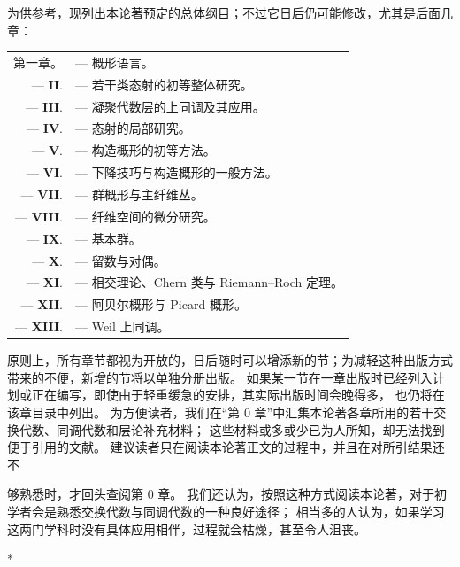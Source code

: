\documentclass[UTF8,fontset=none,11pt,oneside,openany]{ctexbook}
\newcommand{\oldpage}[2][]{%
  \hypertarget{ega-source-page-#1-#2}{}%
  \marginnote{\scriptsize\textbf{#1}~|~#2}\ignorespaces}
\begin{document}
为供参考，现列出本论著预定的总体纲目；不过它日后仍可能修改，尤其是后面几章：

\medskip
\begin{tabular}{rl}
  第一章。 & --- 概形语言。\\
  --- \textbf{II}. & --- 若干类态射的初等整体研究。\\
  --- \textbf{III}. & --- 凝聚代数层的上同调及其应用。\\
  --- \textbf{IV}. & --- 态射的局部研究。\\
  --- \textbf{V}. & --- 构造概形的初等方法。\\
  --- \textbf{VI}. & --- 下降技巧与构造概形的一般方法。\\
  --- \textbf{VII}. & --- 群概形与主纤维丛。\\
  --- \textbf{VIII}. & --- 纤维空间的微分研究。\\
  --- \textbf{IX}. & --- 基本群。\\
  --- \textbf{X}. & --- 留数与对偶。\\
  --- \textbf{XI}. & --- 相交理论、Chern 类与 Riemann--Roch 定理。\\
  --- \textbf{XII}. & --- 阿贝尔概形与 Picard 概形。\\
  --- \textbf{XIII}. & --- Weil 上同调。\\
\end{tabular}
\medskip

原则上，所有章节都视为开放的，日后随时可以增添新的节；为减轻这种出版方式带来的不便，新增的节将以单独分册出版。
如果某一节在一章出版时已经列入计划或正在编写，即使由于轻重缓急的安排，其实际出版时间会晚得多，
也仍将在该章目录中列出。
为方便读者，我们在“第 0 章”中汇集本论著各章所用的若干交换代数、同调代数和层论补充材料；
这些材料或多或少已为人所知，却无法找到便于引用的文献。
建议读者只在阅读本论著正文的过程中，并且在对所引结果还不

\oldpage[I]{7}
够熟悉时，才回头查阅第 0 章。
我们还认为，按照这种方式阅读本论著，对于初学者会是熟悉交换代数与同调代数的一种良好途径；
相当多的人认为，如果学习这两门学科时没有具体应用相伴，过程就会枯燥，甚至令人沮丧。

\bigskip
\begin{center}*\quad*\quad*\end{center}
\bigskip
\end{document}

